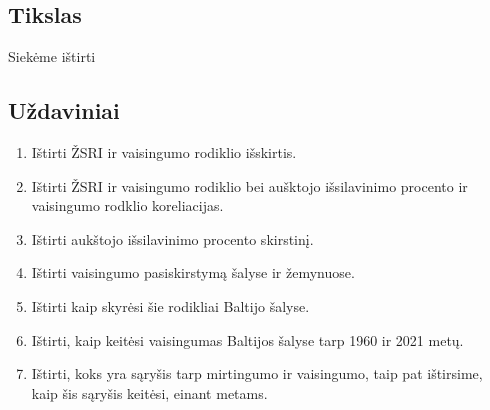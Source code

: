 \subsection{Tikslas} 
Siekėme ištirti 

\subsection{Uždaviniai}
\begin{enumerate}
    \item Ištirti ŽSRI ir vaisingumo rodiklio išskirtis.
    \item Ištirti ŽSRI ir vaisingumo rodiklio bei aušktojo išsilavinimo procento ir vaisingumo rodklio koreliacijas.
    \item Ištirti aukštojo išsilavinimo procento skirstinį.
    \item Ištirti vaisingumo pasiskirstymą šalyse ir žemynuose.
    \item Ištirti kaip skyrėsi šie rodikliai Baltijo šalyse.
    \item Ištirti, kaip keitėsi vaisingumas Baltijos šalyse tarp 1960 ir 2021 metų.
    \item Ištirti, koks yra sąryšis tarp mirtingumo ir vaisingumo, taip pat ištirsime, kaip šis sąryšis keitėsi, einant metams.
\end{enumerate}